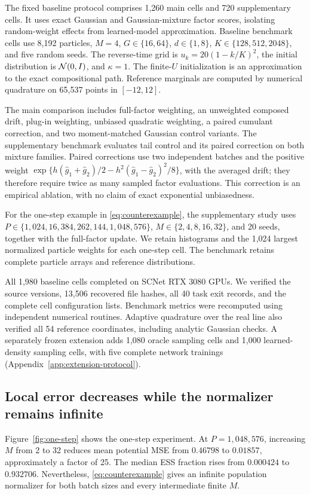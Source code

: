 The fixed baseline protocol comprises 1,260 main cells and 720 supplementary cells. It uses exact Gaussian and Gaussian-mixture factor scores, isolating random-weight effects from learned-model approximation. Baseline benchmark cells use 8,192 particles, $M=4$, $G\in\{16,64\}$, $d\in\{1,8\}$, $K\in\{128,512,2048\}$, and five random seeds. The reverse-time grid is $u_k=20(1-k/K)^2$, the initial distribution is $\mathcal N(0,I)$, and $\kappa=1$. The finite-$U$ initialization is an approximation to the exact compositional path. Reference marginals are computed by numerical quadrature on 65,537 points in $[-12,12]$.

The main comparison includes full-factor weighting, an unweighted composed drift, plug-in weighting, unbiased quadratic weighting, a paired cumulant correction, and two moment-matched Gaussian control variants. The supplementary benchmark evaluates tail control and its paired correction on both mixture families. Paired corrections use two independent batches and the positive weight $\exp\{h(\widehat g_1+\widehat g_2)/2-h^2(\widehat g_1-\widehat g_2)^2/8\}$, with the averaged drift; they therefore require twice as many sampled factor evaluations. This correction is an empirical ablation, with no claim of exact exponential unbiasedness.

For the one-step example in \eqref{eq:counterexample}, the supplementary study uses $P\in\{1{,}024,16{,}384,262{,}144,1{,}048{,}576\}$, $M\in\{2,4,8,16,32\}$, and 20 seeds, together with the full-factor update. We retain histograms and the 1,024 largest normalized particle weights for each one-step cell. The benchmark retains complete particle arrays and reference distributions.

All 1,980 baseline cells completed on SCNet RTX 3080 GPUs. We verified the source versions, 13,506 recovered file hashes, all 40 task exit records, and the complete cell configuration lists. Benchmark metrics were recomputed using independent numerical routines. Adaptive quadrature over the real line also verified all 54 reference coordinates, including analytic Gaussian checks. A separately frozen extension adds 1,080 oracle sampling cells and 1,000 learned-density sampling cells, with five complete network trainings (Appendix~\ref{app:extension-protocol}).

\subsection{Local error decreases while the normalizer remains infinite}
Figure~\ref{fig:one-step} shows the one-step experiment. At $P=1{,}048{,}576$, increasing $M$ from 2 to 32 reduces mean potential MSE from $0.46798$ to $0.01857$, approximately a factor of 25. The median ESS fraction rises from $0.000424$ to $0.932706$. Nevertheless, \eqref{eq:counterexample} gives an infinite population normalizer for both batch sizes and every intermediate finite $M$.

